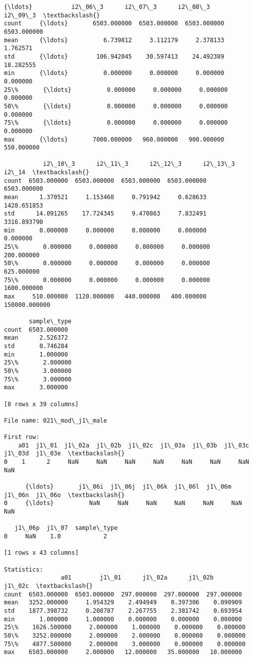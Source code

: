 \documentclass[11pt]{article}
\begin{document}
\begin{Verbatim}[commandchars=\\\{\}]
          {\ldots}           i2\_06\_3      i2\_07\_3      i2\_08\_3      i2\_09\_3  \textbackslash{}
count     {\ldots}       6503.000000  6503.000000  6503.000000  6503.000000   
mean      {\ldots}          6.739812     3.112179     2.378133     1.762571   
std       {\ldots}        106.942045    30.597413    24.492389    18.282555   
min       {\ldots}          0.000000     0.000000     0.000000     0.000000   
25\%       {\ldots}          0.000000     0.000000     0.000000     0.000000   
50\%       {\ldots}          0.000000     0.000000     0.000000     0.000000   
75\%       {\ldots}          0.000000     0.000000     0.000000     0.000000   
max       {\ldots}       7000.000000   960.000000   900.000000   550.000000   

           i2\_10\_3      i2\_11\_3      i2\_12\_3      i2\_13\_3          i2\_14  \textbackslash{}
count  6503.000000  6503.000000  6503.000000  6503.000000    6503.000000   
mean      1.370521     1.153468     0.791942     0.628633    1428.651853   
std      14.091265    17.724345     9.470863     7.832491    3316.893790   
min       0.000000     0.000000     0.000000     0.000000       0.000000   
25\%       0.000000     0.000000     0.000000     0.000000     200.000000   
50\%       0.000000     0.000000     0.000000     0.000000     625.000000   
75\%       0.000000     0.000000     0.000000     0.000000    1600.000000   
max     510.000000  1120.000000   440.000000   400.000000  150000.000000   

       sample\_type  
count  6503.000000  
mean      2.526372  
std       0.746284  
min       1.000000  
25\%       2.000000  
50\%       3.000000  
75\%       3.000000  
max       3.000000  

[8 rows x 39 columns]

File name: 021\_mod\_j1\_male

First row: 
    a01  j1\_01  j1\_02a  j1\_02b  j1\_02c  j1\_03a  j1\_03b  j1\_03c  j1\_03d  j1\_03e  \textbackslash{}
0    1      2     NaN     NaN     NaN     NaN     NaN     NaN     NaN     NaN   

      {\ldots}       j1\_06i  j1\_06j  j1\_06k  j1\_06l  j1\_06m  j1\_06n  j1\_06o  \textbackslash{}
0     {\ldots}          NaN     NaN     NaN     NaN     NaN     NaN     NaN   

   j1\_06p  j1\_07  sample\_type  
0     NaN    1.0            2  

[1 rows x 43 columns]

Statistics: 
                a01        j1\_01      j1\_02a      j1\_02b      j1\_02c  \textbackslash{}
count  6503.000000  6503.000000  297.000000  297.000000  297.000000   
mean   3252.000000     1.954329    2.494949    0.397306    0.090909   
std    1877.398732     0.208787    2.267755    2.381742    0.693954   
min       1.000000     1.000000    0.000000    0.000000    0.000000   
25\%    1626.500000     2.000000    1.000000    0.000000    0.000000   
50\%    3252.000000     2.000000    2.000000    0.000000    0.000000   
75\%    4877.500000     2.000000    3.000000    0.000000    0.000000   
max    6503.000000     2.000000   12.000000   35.000000   10.000000   


\end{Verbatim}
\end{document}
